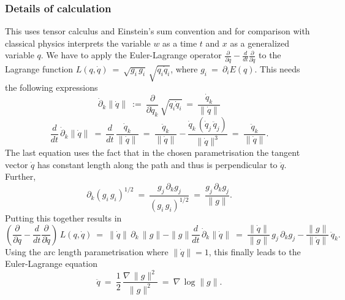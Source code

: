\subsubsection*{Details of calculation}
This uses tensor calculus and Einstein's sum convention and for
comparison with classical physics interprets the variable $w$ as a time $t$ and $x$ as a
generalized variable $q$.
We have to apply the Euler-Lagrange operator
$\frac{\partial}{\partial q} -  \frac{d}{dt}\frac{\partial}{\partial \dot{q}}$
to the Lagrange function $L(q,\dot{q}) ~=~ \sqrt{g_i\,g_i } \,
 \sqrt{ \dot{q}_i \dot{q}_i}$, where $g_i ~=~ \partial_i E(q)$.
This needs the following expressions
\begin{equation}\label{NR1}
  \dot{\partial}_k \|\dot{q}\|~:=~\frac{\partial}{\partial \dot{q}_k}\, \sqrt{ \dot{q}_i \dot{q}_i}~=~\frac{\dot{q}_k}{\|\dot{q}\|}
\end{equation}
\begin{equation}\label{NR2}
 \frac{d}{dt} \,\dot{\partial}_k \|\dot{q}\| ~=~ \frac{d}{dt}\,\frac{\dot{q}_k}{\|\dot{q}\|}~=~
\frac{\ddot{q}_k}{\|\dot{q}\|}-\frac{\dot{q}_k\,(\dot{q}_j\,\ddot{q}_j)}{\|\dot{q}\|^3}~=~
\frac{\ddot{q}_k}{\|\dot{q}\|}.
\end{equation}
The last equation uses the fact that in the chosen parametrisation
 the tangent vector $\dot{q}$ has constant length along the path
and thus   is perpendicular to $\ddot{q}$.
Further,
\begin{equation}\label{NR3}
\partial_k (g_i\,g_i)^{1/2}~=~\frac{ g_j\,\partial_k g_j}{(g_i\,g_i)^{1/2}}~=~\frac{ g_j\,\partial_k g_j}{\|g\|}.
 \end{equation}
Putting this together results in
\begin{equation}\label{NR4}
\left( \frac{\partial}{\partial q} -  \frac{d}{dt}\frac{\partial}{\partial \dot{q}}\right)\,L(q,\dot{q})
 ~=~
 \|\dot{q}\|\,\partial_k\,\|g\| - \|g\|  \frac{d}{dt} \,\dot{\partial}_k \|\dot{q}\|~=~
 \frac{\|\dot{q}\|}{\|g\|}\, g_j\,\partial_k g_j - \frac{\|g\|}{\|\dot{q}\|}\,\ddot{q}_k.
  \end{equation}
Using the arc length parametrisation where $\|\dot{q}\|=1$,
this finally leads to the Euler-Lagrange equation
\begin{equation}\label{EL-3}
\ddot{q}~=~ \frac12 \,\frac{\nabla\, \|g\|^2}{\|g\|^2}~=~  \nabla\,\log \|g\|.
\end{equation}
